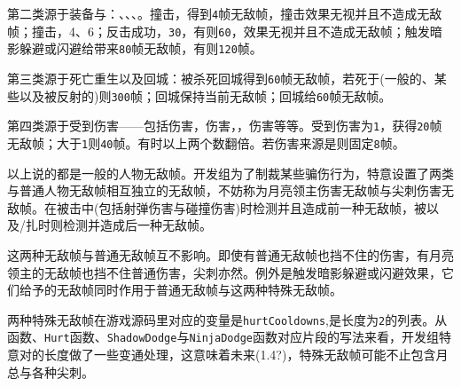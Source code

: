第二类源于装备与：、、、。撞击，得到\lstinline{4}帧无敌帧，撞击效果无视并且不造成无敌帧；撞击，4、6；反击成功，\lstinline{30}，有则\lstinline{60}，效果无视并且不造成无敌帧；触发暗影躲避或闪避给带来\lstinline{80}帧无敌帧，有则\lstinline{120}帧。

第三类源于死亡重生以及回城：被杀死回城得到\lstinline{60}帧无敌帧，若死于(一般的、某些以及被反射的)则\lstinline{300}帧；回城保持当前无敌帧；回城给\lstinline{60}帧无敌帧。

第四类源于受到伤害——包括伤害，伤害，，伤害等等。受到伤害为\lstinline{1}，获得\lstinline{20}帧无敌帧；大于\lstinline{1}则\lstinline{40}帧。有时以上两个数翻倍。若伤害来源是则固定\lstinline{8}帧。

以上说的都是一般的人物无敌帧。开发组为了制裁某些骗伤行为，特意设置了两类与普通人物无敌帧相互独立的无敌帧，不妨称为月亮领主伤害无敌帧与尖刺伤害无敌帧。在被击中(包括射弹伤害与碰撞伤害)时检测并且造成前一种无敌帧，被以及/扎时则检测并造成后一种无敌帧。

这两种无敌帧与普通无敌帧互不影响。即使有普通无敌帧也挡不住的伤害，有月亮领主的无敌帧也挡不住普通伤害，尖刺亦然。例外是触发暗影躲避或闪避效果，它们给予的无敌帧同时作用于普通无敌帧与这两种特殊无敌帧。

两种特殊无敌帧在游戏源码里对应的变量是\lstinline{hurtCooldowns},是长度为\lstinline{2}的列表。从函数、\lstinline{Hurt}函数、\lstinline{ShadowDodge}与\lstinline{NinjaDodge}函数对应片段的写法来看，开发组特意对的长度做了一些变通处理，这意味着未来(1.4?)，特殊无敌帧可能不止包含月总与各种尖刺。
